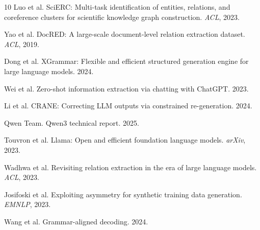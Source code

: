 \documentclass[11pt,a4paper]{article}
\begin{document}

\begin{thebibliography}{10}
 Luo et al. SciERC: Multi-task identification of entities, relations, and coreference clusters for scientific knowledge graph construction. \textit{ACL}, 2023.

 Yao et al. DocRED: A large-scale document-level relation extraction dataset. \textit{ACL}, 2019.

 Dong et al. XGrammar: Flexible and efficient structured generation engine for large language models. 2024.

 Wei et al. Zero-shot information extraction via chatting with ChatGPT. 2023.

 Li et al. CRANE: Correcting LLM outputs via constrained re-generation. 2024.

 Qwen Team. Qwen3 technical report. 2025.

 Touvron et al. Llama: Open and efficient foundation language models. \textit{arXiv}, 2023.

 Wadhwa et al. Revisiting relation extraction in the era of large language models. \textit{ACL}, 2023.

 Josifoski et al. Exploiting asymmetry for synthetic training data generation. \textit{EMNLP}, 2023.

 Wang et al. Grammar-aligned decoding. 2024.
\end{thebibliography}
\end{document}

